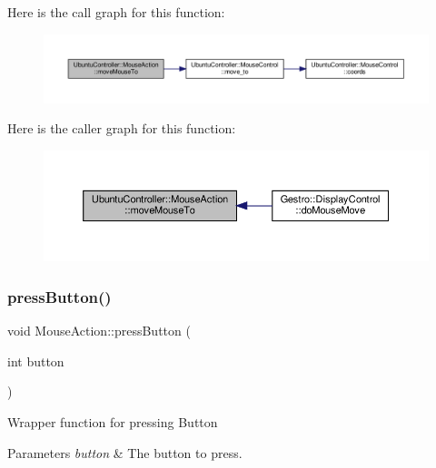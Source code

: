 Here is the call graph for this function\+:
\nopagebreak
\begin{figure}[H]
\begin{center}
\leavevmode
\includegraphics[width=350pt]{class_ubuntu_controller_1_1_mouse_action_a7a14cab01ad2ccdb1b135d4bae939fe2_cgraph}
\end{center}
\end{figure}
Here is the caller graph for this function\+:
\nopagebreak
\begin{figure}[H]
\begin{center}
\leavevmode
\includegraphics[width=350pt]{class_ubuntu_controller_1_1_mouse_action_a7a14cab01ad2ccdb1b135d4bae939fe2_icgraph}
\end{center}
\end{figure}
\mbox{\label{class_ubuntu_controller_1_1_mouse_action_aa017b86a7e358e7a74a8ec50a5a191cf}} 
\subsubsection{\texorpdfstring{press\+Button()}{pressButton()}}
{\footnotesize\ttfamily void Mouse\+Action\+::press\+Button (\begin{DoxyParamCaption}\item[{int}]{button }\end{DoxyParamCaption})}

Wrapper function for pressing Button


\begin{DoxyParams}{Parameters}
{\em button} & The button to press. \\
\hline
\end{DoxyParams}


